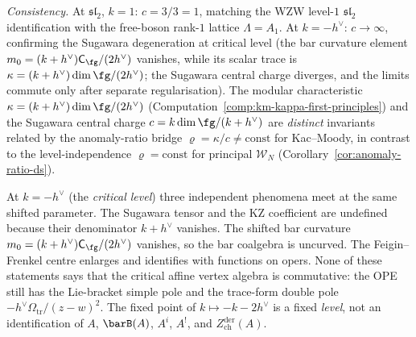 \begin{computation}
\emph{Consistency.} At $\mathfrak{sl}_2$, $k=1$: $c = 3/3 = 1$,
matching the WZW level-$1$ $\mathfrak{sl}_2$ identification with
the free-boson rank-$1$ lattice $\Lambda = A_1$. At $k = -h^\vee$:
$c\to\infty$, confirming the Sugawara degeneration at critical
level (the bar curvature element
$m_0=(k+h^\vee)\mathsf C_{\fg}/(2h^\vee)$ vanishes, while its
scalar trace is
$\kappa=(k+h^\vee)\dim\fg/(2h^\vee)$; the Sugawara central charge
diverges, and the limits commute only after separate
regularisation). The modular characteristic
$\kappa = (k+h^\vee)\dim\fg/(2h^\vee)$
\textup{(}Computation~\textup{\ref{comp:km-kappa-first-principles}}\textup{)}
and the Sugawara central charge $c = k\dim\fg/(k+h^\vee)$ are
\emph{distinct} invariants related by the anomaly-ratio bridge
$\varrho = \kappa/c \neq \mathrm{const}$ for Kac--Moody, in
contrast to the level-independence $\varrho = \mathrm{const}$ for
principal $\mathcal W_N$ (Corollary~\textup{\ref{cor:anomaly-ratio-ds}}).
\end{computation}

\begin{remark}
At $k = -h^\vee$ (the \emph{critical level}) three independent
phenomena meet at the same shifted parameter.  The Sugawara tensor
and the KZ coefficient are undefined because their denominator
$k+h^\vee$ vanishes.  The shifted bar curvature
$m_0=(k+h^\vee)\mathsf C_{\fg}/(2h^\vee)$ vanishes, so the bar
coalgebra is uncurved.  The Feigin--Frenkel centre enlarges and
identifies with functions on opers.  None of these statements says
that the critical affine vertex algebra is commutative: the OPE still
has the Lie-bracket simple pole and the trace-form double pole
$-h^\vee\Omega_{\mathrm{tr}}/(z-w)^2$.  The fixed point of
$k\mapsto -k-2h^\vee$ is a fixed \emph{level}, not an identification
of $A$, $\barB(A)$, $A^i$, $A^!$, and
$Z^{\mathrm{der}}_{\mathrm{ch}}(A)$.
\end{remark}

